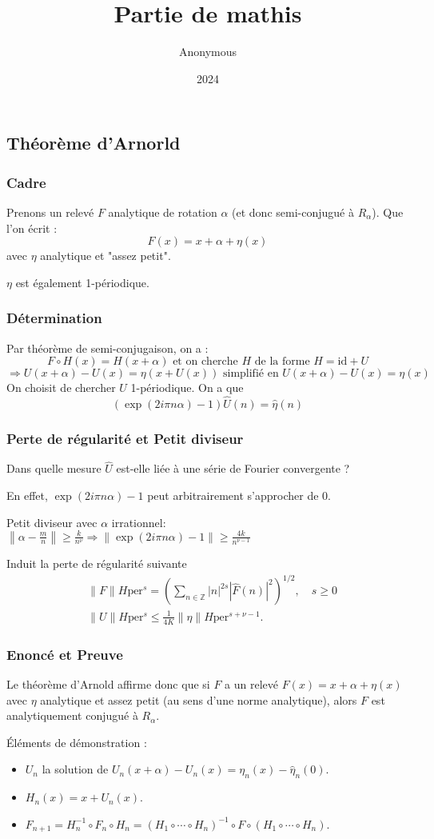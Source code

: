 \documentclass{beamer}
\title{Partie de mathis}
\author{Anonymous}
\institute{Overleaf}
\date{2024}
\begin{document}
\frame{\titlepage}


\subsection*{Théorème d'Arnorld}
\begin{frame}
\frametitle{Cadre}
Prenons un relevé $F$ analytique de rotation $\alpha$ (et donc semi-conjugué à $R_\alpha$). Que l'on écrit :
\[ F(x) = x + \alpha + \eta (x) \]
avec $\eta$ analytique et "assez petit".

$\eta$ est également 1-périodique.
\end{frame}

\begin{frame}
\frametitle{Détermination}
Par théorème de semi-conjugaison, on a :
\[ F \circ H(x) = H( x + \alpha) \text{ et on cherche } H \text{ de la forme } H = \text{id} + U \]
\[ \Rightarrow U(x+ \alpha) - U(x) = \eta (x+U(x)) \text{ simplifié en } U(x+ \alpha) - U(x) = \eta (x) \]
On choisit de chercher \( U \) 1-périodique. On a que 
\[ (\exp(2 i \pi n \alpha)-1)\widehat{U} (n) = \widehat{\eta} (n) \]
\end{frame}

\begin{frame}
\frametitle{Perte de régularité et Petit diviseur}
Dans quelle mesure \( \widehat{U} \) est-elle liée à une série de Fourier convergente ?

En effet, \( \exp(2 i \pi n \alpha)-1 \) peut arbitrairement s'approcher de 0.

Petit diviseur avec \( \alpha \) irrationnel: \( \left\| \alpha - \frac{m}{n} \right\| \geq \frac{k}{n^\nu} \Rightarrow \left\| \exp(2 i \pi n \alpha)-1\right\| \geq \frac{4k}{n^{\nu-1}} \)

Induit la perte de régularité suivante
\[
\begin{aligned}
& \|F\|{H{\text{per}}^s} = \left(\sum_{n \in \mathbb{Z}}|n|^{2 s}|\hat{F}(n)|^2\right)^{1 / 2}, \quad s \geq 0 \\
& \|U\|{H{\text{per}}^s} \leq \frac{1}{4 K}\|\eta\|{H{\text{per}}^{s+\nu-1}} .
\end{aligned}
\]
\end{frame}

\begin{frame}
\frametitle{Enoncé et Preuve}
Le théorème d'Arnold affirme donc que si \( F \) a un relevé \( F(x) = x + \alpha + \eta (x) \) avec \( \eta \) analytique et assez petit (au sens d'une norme analytique), alors \( F \) est analytiquement conjugué à \( R_\alpha \).

Éléments de démonstration :
\begin{itemize}
    \item \( U_n \) la solution de \( U_n(x+\alpha)-U_n(x)=\eta_n(x)-\hat{\eta}_n(0) \).
    \item \( H_n(x)=x+U_n(x) \).
    \item \( F_{n+1}=H_n^{-1} \circ F_n \circ H_n=\left(H_1 \circ \cdots \circ H_n\right)^{-1} \circ F \circ\left(H_1 \circ \cdots \circ H_n\right) \).
\end{itemize}
\end{frame}
\end{document}
